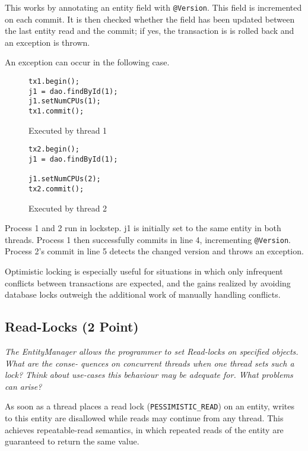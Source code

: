\documentclass[a4paper,10pt]{article}
\begin{document}
This works by annotating an entity field with \lstinline|@Version|. This field
is incremented on each commit. It is then checked whether the field has been updated
between the last entity read and the commit; if yes, the transaction is is rolled back and
an exception is thrown.

An exception can occur in the following case.

\begin{figure}[hl]
\begin{lstlisting}
tx1.begin();
j1 = dao.findById(1);
j1.setNumCPUs(1);
tx1.commit();
\end{lstlisting}
\caption{Executed by thread 1}
\end{figure}

\begin{figure}[hl]
\begin{lstlisting}
tx2.begin();
j1 = dao.findById(1);

j1.setNumCPUs(2);
tx2.commit();
\end{lstlisting}
\caption{Executed by thread 2}
\end{figure}

Process 1 and 2 run in lockstep. j1 is initially set to the same entity in both threads.
Process 1 then successfully commits in line 4, incrementing \lstinline|@Version|.
Process 2's commit in line 5 detects the changed version and throws an exception.

Optimistic locking is especially useful for situations in which only infrequent
conflicts between transactions are expected, and the gains realized by avoiding
database locks outweigh the additional work of manually handling conflicts.

\subsection{Read-Locks (2 Point)}

\emph{The EntityManager allows the programmer to set Read-locks on specified objects. What are the conse-
quences on concurrent threads when one thread sets such a lock? Think about use-cases this behaviour
may be adequate for. What problems can arise?}

\vspace{3mm}

As soon as a thread places a read lock (\lstinline|PESSIMISTIC_READ|) on an entity,
writes to this entity are disallowed while reads may continue from any thread. This
achieves repeatable-read semantics, in which repeated reads of the entity are guaranteed to return the same
value.
\end{document}
